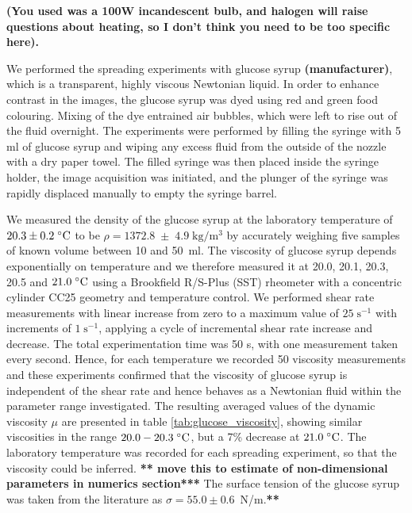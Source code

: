 \documentclass[aip,graphicx]{revtex4-1}
\newcommand{\sym}[1]{\text{#1}} \newcommand{\dif}{\mathrm{d}}
\begin{document}
{\bf (You used was a 100W incandescent bulb, and halogen will raise
  questions about heating, so I don't think you need to be too
  specific here).}

We performed the spreading experiments with glucose syrup {\bf
  (manufacturer)}, which is a transparent, highly viscous Newtonian
liquid. In order to enhance contrast in the images, the glucose syrup
was dyed using red and green food colouring.  Mixing of the dye
entrained air bubbles, which were left to rise out of the fluid
overnight. The experiments were performed by filling the syringe with
5 ml of glucose syrup and wiping any excess fluid from the outside of
the nozzle with a dry paper towel. The filled syringe was then placed
inside the syringe holder, the image acquisition was initiated, and
the plunger of the syringe was rapidly displaced manually to empty the
syringe barrel.

We measured the density of the glucose syrup at the laboratory temperature
of $20.3 \pm 0.2 \; ^{\circ} \text{C}$ to be $\rho=1372.8 \; \pm \; 4.9 \;
\sym{kg}/\sym{m}^3$ by accurately weighing five samples of known
volume between 10 and 50~ml.  The viscosity of glucose syrup depends
exponentially on temperature \cite{llewellin2002rheology} and we
therefore measured it at 20.0, 20.1, 20.3, 20.5 and $21.0 \; ^{\circ} \text{C}$
using a Brookfield R/S-Plus (SST) rheometer with a concentric cylinder
CC25 geometry and temperature control. We performed shear rate
measurements with linear increase from zero to a maximum value of $25
\; \sym{s}^{-1}$ with increments of $1 \; \sym{s}^{-1}$, applying a
cycle of incremental shear rate increase and decrease.  The total
experimentation time was 50 s, with one measurement taken every
second. Hence, for each temperature we recorded 50 viscosity
measurements and these experiments confirmed that the viscosity of
glucose syrup is independent of the shear rate and hence behaves as a
Newtonian fluid within the parameter range investigated. The resulting
averaged values of the dynamic viscosity $\mu$ are presented in table
\ref{tab:glucose_viscosity}, showing similar viscosities in the range
$20.0 - 20.3 \; ^{\circ} \text{C}$, but a 7\% decrease at $21.0 \; ^{\circ} \text{C}$. The
laboratory temperature was recorded for each spreading experiment, so
that the viscosity could be inferred. {\bf ***  move this to
  estimate of non-dimensional parameters in numerics section***}
The surface tension of the glucose syrup was taken from the 
literature \cite{montanez2013influence} as $\sigma=55.0 \pm 0.6$~N/m.{\bf ***}
\end{document}
